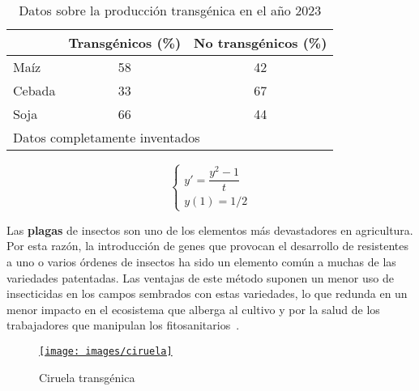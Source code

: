 \documentclass[11pt,a4paper]{article}
\begin{document}
\begin{table}
\begin{center}
\begin{tabular}{|l|c|c|}
\hline
     &  Transgénicos (\%)  & No transgénicos (\%)  \\
\hline\hline
Maíz  &    58  &   42 \\
\hline
Cebada &   33   &  67   \\
\hline
Soja   &  66   & 44 \\
\hline
\multicolumn{3}{l}{\footnotesize Datos completamente inventados}
\end{tabular}
\caption{Datos sobre la producción transgénica en el año 2023}
\label{tabla.transg2}
\end{center}
\end{table}


%
\begin{equation}\label{eq2}
\left\{\begin{array}{l}   
	y'=\dfrac{y^2-1}{t}  \\  
	y(1)=1/2 
\end{array}\right.
\end{equation}
%

%
% 
% 

Las \hypertarget{target.plagas}{\textbf{plagas}} de insectos son uno de los elementos más devastadores en agricultura.
Por esta razón, la introducción de genes que provocan el desarrollo de resistentes a uno o varios órdenes de insectos ha sido un elemento común a muchas de las variedades patentadas. Las ventajas de este método suponen un menor uso de insecticidas en los campos sembrados con estas variedades,
lo que redunda en un menor impacto en el ecosistema que alberga al cultivo y por la salud de los trabajadores que manipulan los fitosanitarios~\cite{olga1}.


%
%

\begin{figure}[h]
\centering
\hyperlink{target.tabaco}{\texttt{[image: images/ciruela]}}
\caption{Ciruela transgénica}
\label{ciruela}
\end{figure}
\end{document}
